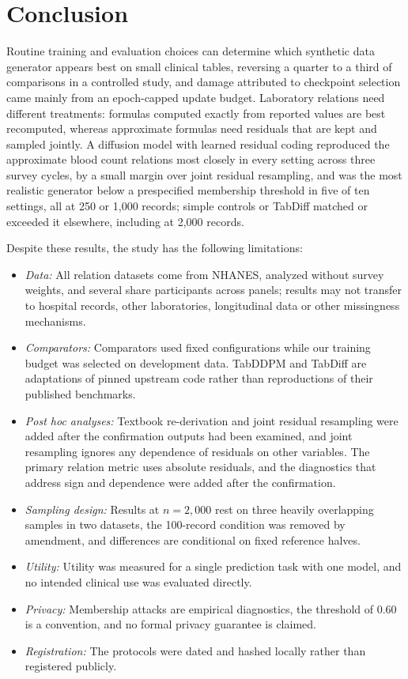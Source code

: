 \documentclass[conference]{IEEEtran}
\begin{document}
\section{Conclusion}
\label{sec:conclusion}

Routine training and evaluation choices can determine which synthetic data generator appears best on small clinical tables, reversing a quarter to a third of comparisons in a controlled study, and damage attributed to checkpoint selection came mainly from an epoch-capped update budget. Laboratory relations need different treatments: formulas computed exactly from reported values are best recomputed, whereas approximate formulas need residuals that are kept and sampled jointly. A diffusion model with learned residual coding reproduced the approximate blood count relations most closely in every setting across three survey cycles, by a small margin over joint residual resampling, and was the most realistic generator below a prespecified membership threshold in five of ten settings, all at 250 or 1,000 records; simple controls or TabDiff matched or exceeded it elsewhere, including at 2,000 records.

Despite these results, the study has the following limitations:
\begin{itemize}
\item \textit{Data:} All relation datasets come from NHANES, analyzed without survey weights, and several share participants across panels; results may not transfer to hospital records, other laboratories, longitudinal data or other missingness mechanisms.
\item \textit{Comparators:} Comparators used fixed configurations while our training budget was selected on development data. TabDDPM and TabDiff are adaptations of pinned upstream code rather than reproductions of their published benchmarks.
\item \textit{Post hoc analyses:} Textbook re-derivation and joint residual resampling were added after the confirmation outputs had been examined, and joint resampling ignores any dependence of residuals on other variables. The primary relation metric uses absolute residuals, and the diagnostics that address sign and dependence were added after the confirmation.
\item \textit{Sampling design:} Results at $n = 2{,}000$ rest on three heavily overlapping samples in two datasets, the 100-record condition was removed by amendment, and differences are conditional on fixed reference halves.
\item \textit{Utility:} Utility was measured for a single prediction task with one model, and no intended clinical use was evaluated directly.
\item \textit{Privacy:} Membership attacks are empirical diagnostics, the threshold of 0.60 is a convention, and no formal privacy guarantee is claimed.
\item \textit{Registration:} The protocols were dated and hashed locally rather than registered publicly.
\end{itemize}
\end{document}
